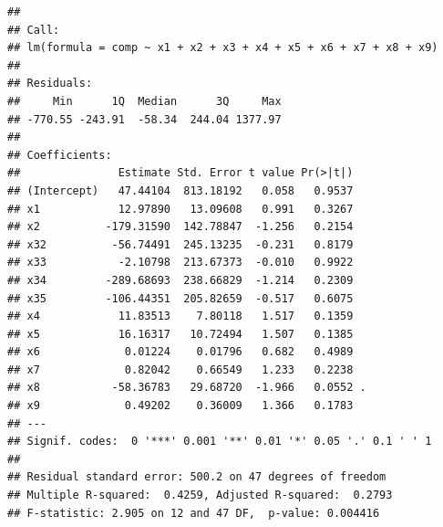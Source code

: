 \documentclass[
]{article}
\newenvironment{Shaded}{\begin{snugshade}}{\end{snugshade}}
\newcommand{\FunctionTok}[1]{\textcolor[rgb]{0.13,0.29,0.53}{\textbf{#1}}}
\newcommand{\NormalTok}[1]{#1}
\newcommand{\OtherTok}[1]{\textcolor[rgb]{0.56,0.35,0.01}{#1}}
\newcommand{\SpecialCharTok}[1]{\textcolor[rgb]{0.81,0.36,0.00}{\textbf{#1}}}
\begin{document}
\begin{Shaded}
\end{Shaded}

\begin{verbatim}
## 
## Call:
## lm(formula = comp ~ x1 + x2 + x3 + x4 + x5 + x6 + x7 + x8 + x9)
## 
## Residuals:
##     Min      1Q  Median      3Q     Max 
## -770.55 -243.91  -58.34  244.04 1377.97 
## 
## Coefficients:
##               Estimate Std. Error t value Pr(>|t|)  
## (Intercept)   47.44104  813.18192   0.058   0.9537  
## x1            12.97890   13.09608   0.991   0.3267  
## x2          -179.31590  142.78847  -1.256   0.2154  
## x32          -56.74491  245.13235  -0.231   0.8179  
## x33           -2.10798  213.67373  -0.010   0.9922  
## x34         -289.68693  238.66829  -1.214   0.2309  
## x35         -106.44351  205.82659  -0.517   0.6075  
## x4            11.83513    7.80118   1.517   0.1359  
## x5            16.16317   10.72494   1.507   0.1385  
## x6             0.01224    0.01796   0.682   0.4989  
## x7             0.82042    0.66549   1.233   0.2238  
## x8           -58.36783   29.68720  -1.966   0.0552 .
## x9             0.49202    0.36009   1.366   0.1783  
## ---
## Signif. codes:  0 '***' 0.001 '**' 0.01 '*' 0.05 '.' 0.1 ' ' 1
## 
## Residual standard error: 500.2 on 47 degrees of freedom
## Multiple R-squared:  0.4259, Adjusted R-squared:  0.2793 
## F-statistic: 2.905 on 12 and 47 DF,  p-value: 0.004416
\end{verbatim}
\end{document}
